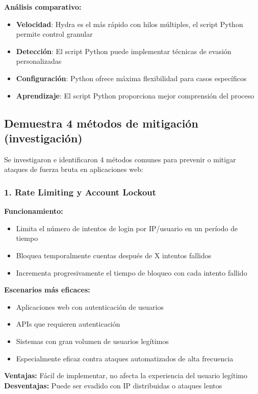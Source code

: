 \documentclass[letter,12pt]{article}
\begin{document}
\textbf{Análisis comparativo:}
\begin{itemize}
    \item \textbf{Velocidad}: Hydra es el más rápido con hilos múltiples, el script Python permite control granular
    \item \textbf{Detección}: El script Python puede implementar técnicas de evasión personalizadas
    \item \textbf{Configuración}: Python ofrece máxima flexibilidad para casos específicos
    \item \textbf{Aprendizaje}: El script Python proporciona mejor comprensión del proceso
\end{itemize}

\newpage
\subsection{Demuestra 4 métodos de mitigación (investigación)}

Se investigaron e identificaron 4 métodos comunes para prevenir o mitigar ataques de fuerza bruta en aplicaciones web:

\subsubsection{1. Rate Limiting y Account Lockout}

\textbf{Funcionamiento:}
\begin{itemize}
    \item Limita el número de intentos de login por IP/usuario en un período de tiempo
    \item Bloquea temporalmente cuentas después de X intentos fallidos
    \item Incrementa progresivamente el tiempo de bloqueo con cada intento fallido
\end{itemize}

\textbf{Escenarios más eficaces:}
\begin{itemize}
    \item Aplicaciones web con autenticación de usuarios
    \item APIs que requieren autenticación  
    \item Sistemas con gran volumen de usuarios legítimos
    \item Especialmente eficaz contra ataques automatizados de alta frecuencia
\end{itemize}

\textbf{Ventajas:} Fácil de implementar, no afecta la experiencia del usuario legítimo \\
\textbf{Desventajas:} Puede ser evadido con IP distribuidas o ataques lentos
\end{document}
